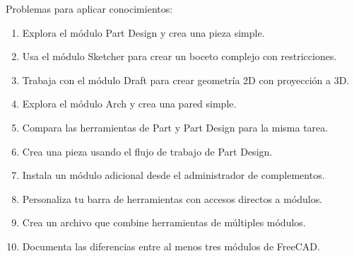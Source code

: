 Problemas para aplicar conocimientos:
\begin{enumerate}
	\item Explora el módulo Part Design y crea una pieza
	      simple.
	\item Usa el módulo Sketcher para crear un boceto
	      complejo con restricciones.
	\item Trabaja con el módulo Draft para crear geometría
	      2D con proyección a 3D.
	\item Explora el módulo Arch y crea una pared simple.
	\item Compara las herramientas de Part y Part Design
	      para la misma tarea.
	\item Crea una pieza usando el flujo de trabajo de
	      Part Design.
	\item Instala un módulo adicional desde el administrador
	      de complementos.
	\item Personaliza tu barra de herramientas con accesos
	      directos a módulos.
	\item Crea un archivo que combine herramientas de
	      múltiples módulos.
	\item Documenta las diferencias entre al menos tres
	      módulos de FreeCAD.
\end{enumerate}
